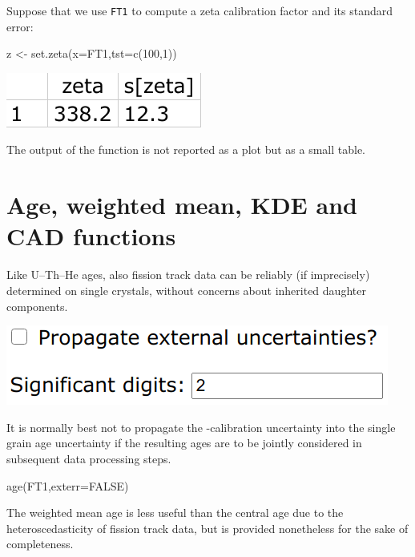\begin{refsection}
Suppose that we use \texttt{FT1} to compute a zeta calibration factor
and its standard error:

\begin{console}
z <- set.zeta(x=FT1,tst=c(100,1))
\end{console}

\noindent\begin{minipage}[t]{.2\linewidth}
\strut\vspace*{-\baselineskip}\newline
\includegraphics[width=\linewidth]{../figures/zetaoutput.png}
\end{minipage}
\begin{minipage}[t]{.8\linewidth}
The output of the function is not reported as a plot but as a small table.
\end{minipage}

\section{Age, weighted mean, KDE and CAD functions}

Like U--Th--He ages, also fission track data can be reliably (if
imprecisely) determined on single crystals, without concerns about
inherited daughter components.

\noindent\begin{minipage}[t]{.4\linewidth}
\strut\vspace*{-\baselineskip}\newline
\includegraphics[width=\linewidth]{../figures/FTageSettings.png}
\end{minipage}
\begin{minipage}[t]{.6\linewidth}
  It is normally best not to propagate the \textzeta-calibration
  uncertainty into the single grain age uncertainty if the resulting
  ages are to be jointly considered in subsequent data processing
  steps.
\end{minipage}

\begin{console}
age(FT1,exterr=FALSE)
\end{console}

The weighted mean age is less useful than the central age due to the
heteroscedasticity of fission track data, but is provided nonetheless
for the sake of completeness.

\printbibliography[heading=subbibliography]

\end{refsection}
